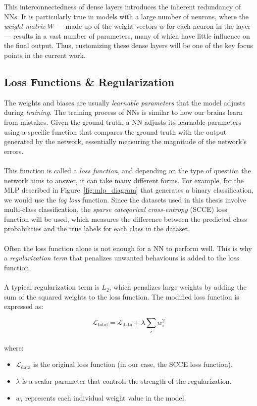 \noindent This interconnectedness of dense layers introduces the inherent redundancy of NNs. 
It is particularly true in models with a large number of neurons, where the \textit{weight matrix}
\( W \) — made up of the weight vectors \( w \) for each neuron in the layer — results 
in a vast number of parameters, many of which have little influence on the final output.
Thus, customizing these dense layers will be one of the key focus points in the current work.


\subsection{Loss Functions \& Regularization}
\label{subsec:subsection2}
The weights and biases are usually \textit{learnable parameters}
that the model adjusts during \textit{training}.
The training process of NNs is similar to how our brains learn from mistakes. 
Given the ground truth, a NN adjusts its learnable parameters 
using a specific function that compares the ground truth with the output generated by the network, 
essentially measuring the magnitude of the network's errors.
\\
\\
This function is called a \textit{loss function}, and depending on the type of question the network aims to answer, it can take many different forms.
For example, for the MLP described in Figure~\ref{fig:mlp_diagram} that generates a binary classification, we would use the \textit{log loss} function. 
Since the datasets used in this thesis involve multi-class classification, the \textit{sparse categorical cross-entropy} (SCCE) loss function will be used, 
which measures the difference between the predicted class probabilities and the true labels for each class in the dataset.
\\
\\
Often the loss function alone is not enough for a NN to perform well. This is why a \textit{regularization term} that penalizes unwanted behaviours
is added to the loss function.
\\
\\
A typical regularization term is \( L_2 \), 
which penalizes large weights by adding the sum of the squared weights to the loss function. 
The modified loss function is expressed as:

\[
\mathcal{L}_{\text{total}} = \mathcal{L}_{\text{data}} + \lambda \sum_{i} w_i^2
\]
\\
\noindent where:

\begin{itemize}
  \item \( \mathcal{L}_{\text{data}} \) is the original loss function (in our case, the SCCE loss function).
  \item \( \lambda \) is a scalar parameter that controls the strength of the regularization.
  \item \( w_i \) represents each individual weight value in the model.
\end{itemize}

